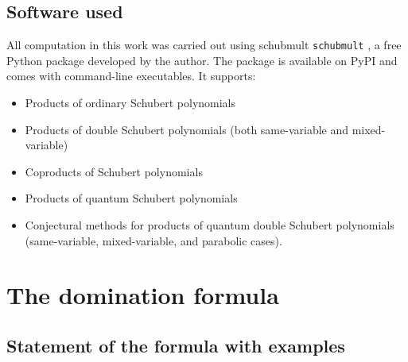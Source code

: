 \documentclass{amsart}
\theoremstyle{definition}
\theoremstyle{remark}
\numberwithin{equation}{subsection}
\begin{document}

\subsection*{Software used}

All computation in this work was carried out using schubmult \verb|schubmult| \cite{schubmult},  a free Python package developed by the author. The package is available on PyPI and comes with command-line executables. It supports:
\begin{itemize}
    \item Products of ordinary Schubert polynomials
    \item Products of double Schubert polynomials (both same-variable and mixed-variable)
    \item Coproducts of Schubert polynomials
    \item Products of quantum Schubert polynomials
    \item Conjectural methods for products of quantum double Schubert polynomials (same-variable, mixed-variable, and parabolic cases).
\end{itemize}



\section{The domination formula} \label{section:dualpieri}

\subsection{Statement of the formula with examples}
\end{document}
